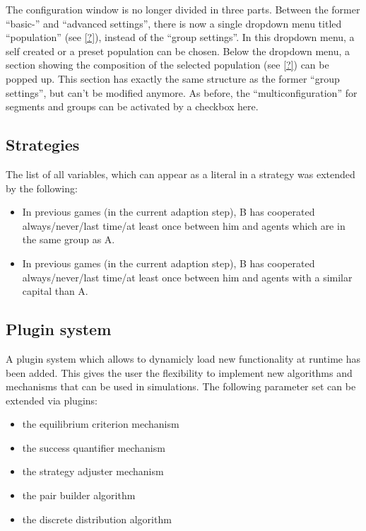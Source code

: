 \documentclass[parskip=full,11pt]{scrartcl}
\begin{document}
The configuration window is no longer divided in three parts. Between the former \enquote{basic-}  and \enquote{advanced settings}, there is now a single dropdown menu titled \enquote{population} (see \cref{?}), instead of the  \enquote{group settings}. In this dropdown menu, a self created or a preset population can be chosen. Below the dropdown menu, a section showing the composition of the selected population (see \cref{?}) can be popped up. This section has exactly the  same structure as the former \enquote{group settings}, but can't be modified anymore. As before, the  \enquote{multiconfiguration} for segments and groups can be activated by a checkbox here.

\subsection{Strategies}
The list of all variables, which can appear as a literal in a strategy was extended by the following:
\begin{itemize}
\item In previous games (in the current adaption step), B has cooperated always/never/last time/at least once between him and agents which are in the same group as A.
\item In previous games (in the current adaption step), B has cooperated always/never/last time/at least once between him and agents with a similar capital than A.
\end{itemize}

\subsection{Plugin system}

A plugin system which allows to dynamicly load new functionality at runtime has been added. This gives the user the flexibility to implement new algorithms and mechanisms that can be used in simulations. The following parameter set can be extended via plugins:
\begin{itemize} \itemsep -10pt
	\item the equilibrium criterion mechanism
	\item the success quantifier mechanism
	\item the strategy adjuster mechanism
	\item the pair builder algorithm
	\item the discrete distribution algorithm
\end{itemize}
\end{document}
